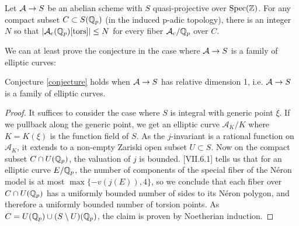 \begin{conjecture}
\label{conjecture}
Let $\mathcal{A}\rightarrow S$ be an abelian scheme with $S$ quasi-projective over $\operatorname{Spec}(\mathbb{Z})$. For any compact subset $C\subset S(\mathbb{Q}_p)$ (in the induced p-adic topology), there is an integer $N$ so that $|\mathcal{A}_c(\mathbb{Q}_p)[\operatorname{tors}]|\leq N$ for every fiber $\mathcal{A}_c/\mathbb{Q}_p$ over $C$.
\end{conjecture}

We can at least prove the conjecture in the case where $\mathcal{A}\rightarrow S$ is a family of elliptic curves:
\begin{proposition}
Conjecture \ref{conjecture} holds when $\mathcal{A}\rightarrow S$ has relative dimension 1, i.e. $\mathcal{A}\rightarrow S$ is a family of elliptic curves.
\end{proposition}
\begin{proof}
It suffices to consider the case where $S$ is integral with generic point $\xi$. If we pullback along the generic point, we get an elliptic curve $\mathcal{A}_K/K$ where $K=K(\xi)$ is the function field of $S$. As the $j$-invariant is a rational function on $\mathcal{A}_K$, it extends to a non-empty Zariski open subset $U\subset S$. Now on the compact subset $C\cap U(\mathbb{Q}_p)$, the valuation of $j$ is bounded. \cite{silverman2009arithmetic}[VII.6.1] tells us that for an elliptic curve $E/\mathbb{Q}_p$, the number of components of the special fiber of the N\'eron model is at most $\max\{-v(j(E)), 4\}$, so we conclude that each fiber over $C\cap U(\mathbb{Q}_p)$ has a uniformly bounded number of sides to its N\'eron polygon, and therefore a uniformly bounded number of torsion points. As $C=U(\mathbb{Q}_p)\cup (S\setminus U)(\mathbb{Q}_p)$, the claim is proven by Noetherian induction.
\end{proof}

